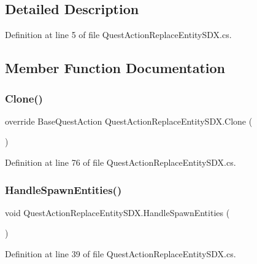 \subsection{Detailed Description}


Definition at line 5 of file Quest\+Action\+Replace\+Entity\+S\+D\+X.\+cs.



\subsection{Member Function Documentation}
\mbox{\label{class_quest_action_replace_entity_s_d_x_a2305810e4e7b526f998f2f4a635bd974}} 
\subsubsection{\texorpdfstring{Clone()}{Clone()}}
{\footnotesize\ttfamily override Base\+Quest\+Action Quest\+Action\+Replace\+Entity\+S\+D\+X.\+Clone (\begin{DoxyParamCaption}{ }\end{DoxyParamCaption})}



Definition at line 76 of file Quest\+Action\+Replace\+Entity\+S\+D\+X.\+cs.

\mbox{\label{class_quest_action_replace_entity_s_d_x_ace14a3f3bb754bb3c6f92376820fb936}} 
\subsubsection{\texorpdfstring{HandleSpawnEntities()}{HandleSpawnEntities()}}
{\footnotesize\ttfamily void Quest\+Action\+Replace\+Entity\+S\+D\+X.\+Handle\+Spawn\+Entities (\begin{DoxyParamCaption}{ }\end{DoxyParamCaption})}



Definition at line 39 of file Quest\+Action\+Replace\+Entity\+S\+D\+X.\+cs.

